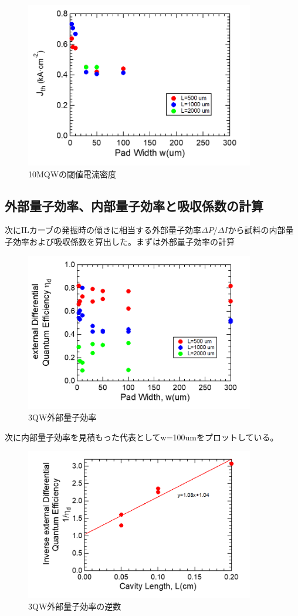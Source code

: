 \begin{figure}[h]
	\centering
	\includegraphics[width=10cm]{figure/fig_3_1_10QW_broadcontact_Jth.png}
		\caption{10MQWの閾値電流密度}
		\label{fig:fig_3_1_10QW_broadcontact_Ith}
\end{figure}
\clearpage
\subsection{外部量子効率、内部量子効率と吸収係数の計算}%
次にILカーブの発振時の傾きに相当する外部量子効率$\Delta P/\Delta I$から試料の内部量子効率および吸収係数を算出した。まずは外部量子効率の計算

\begin{figure}[h]
	\centering
	\includegraphics[width=10cm]{figure/fig_3_1_3QW_broadcontact_id.png}
	\caption{3QW外部量子効率}
	\label{fig:fig_3_1_3QW_broadcontact_id}
\end{figure}
次に内部量子効率を見積もった代表としてw=100umをプロットしている。
\begin{figure}[h]
	\centering
	\includegraphics[width=10cm]{figure/fig_3_1_3QW_broadcontact_id_inverse.png}
	\caption{3QW外部量子効率の逆数}
	\label{fig:fig_3_1_3QW_broadcontact_id_inverse}
\end{figure}


